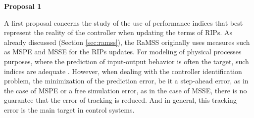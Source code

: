 \medskip
\textbf{Proposal 1} 

A first proposal concerns the study of the use of performance indices that best represent the reality of the controller when updating the terms of RIPs.
As already discussed (Section \ref{sec:ramss}), the RaMSS originally uses measures such as MSPE and MSSE for the RIPs updates.
For modeling of physical processes purposes, where the prediction of input-output behavior is often the target, such indices are adequate \cite{falsone2015}.
%
However, when dealing with the controller identification problem, the minimization of the prediction error, be it a step-ahead error, as in the case of MSPE or a free simulation error, as in the case of MSSE, there is no guarantee that the error of tracking is reduced. And in general, this tracking error is the main target in control systems.
%
%
